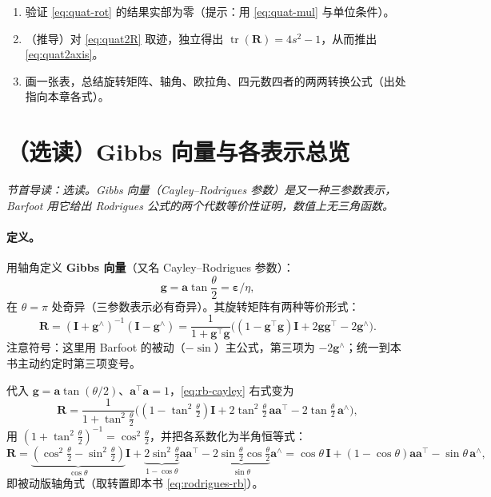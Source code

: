 \begin{practice}
\begin{enumerate}
  \item 验证 \cref{eq:quat-rot} 的结果实部为零（提示：用 \cref{eq:quat-mul} 与单位条件）。
  \item （推导）对 \cref{eq:quat2R} 取迹，独立得出 $\operatorname{tr}(\mathbf{R})=4s^2-1$，从而推出 \cref{eq:quat2axis}。
  \item 画一张表，总结旋转矩阵、轴角、欧拉角、四元数四者的两两转换公式（出处指向本章各式）。
\end{enumerate}
\end{practice}

\section{（选读）Gibbs 向量与各表示总览}
\label{sec:rb-gibbs}
\noindent\emph{节首导读：选读。Gibbs 向量（Cayley--Rodrigues 参数）是又一种三参数表示，Barfoot 用它给出 Rodrigues 公式的两个代数等价性证明，数值上无三角函数。}

\paragraph{定义。}用轴角定义 \textbf{Gibbs 向量}（又名 Cayley--Rodrigues 参数）：
\begin{equation}
  \mathbf{g}=\mathbf{a}\tan\frac{\theta}{2}=\boldsymbol{\varepsilon}/\eta,
  \label{eq:rb-gibbs}
\end{equation}
在 $\theta=\pi$ 处奇异（三参数表示必有奇异）。其旋转矩阵有两种等价形式\cite{barfoot2024state}：
\begin{equation}
  \mathbf{R}=(\mathbf{I}+\mathbf{g}^\wedge)^{-1}(\mathbf{I}-\mathbf{g}^\wedge)
  =\frac{1}{1+\mathbf{g}^\top\mathbf{g}}\big((1-\mathbf{g}^\top\mathbf{g})\mathbf{I}+2\mathbf{g}\mathbf{g}^\top-2\mathbf{g}^\wedge\big).
  \label{eq:rb-cayley}
\end{equation}
注意符号：这里用 Barfoot 的被动（$-\sin$）主公式，第三项为 $-2\mathbf{g}^\wedge$；统一到本书主动约定时第三项变号。

\begin{derivation}
代入 $\mathbf{g}=\mathbf{a}\tan(\theta/2)$、$\mathbf{a}^\top\mathbf{a}=1$，\cref{eq:rb-cayley} 右式变为
\[
  \mathbf{R}=\frac{1}{1+\tan^2\tfrac{\theta}{2}}\Big((1-\tan^2\tfrac{\theta}{2})\mathbf{I}+2\tan^2\tfrac{\theta}{2}\,\mathbf{a}\mathbf{a}^\top-2\tan\tfrac{\theta}{2}\,\mathbf{a}^\wedge\Big),
\]
用 $(1+\tan^2\tfrac{\theta}{2})^{-1}=\cos^2\tfrac{\theta}{2}$，并把各系数化为半角恒等式：
\[
  \mathbf{R}=\underbrace{(\cos^2\tfrac{\theta}{2}-\sin^2\tfrac{\theta}{2})}_{\cos\theta}\mathbf{I}
  +\underbrace{2\sin^2\tfrac{\theta}{2}}_{1-\cos\theta}\mathbf{a}\mathbf{a}^\top
  -\underbrace{2\sin\tfrac{\theta}{2}\cos\tfrac{\theta}{2}}_{\sin\theta}\mathbf{a}^\wedge
  =\cos\theta\,\mathbf{I}+(1-\cos\theta)\mathbf{a}\mathbf{a}^\top-\sin\theta\,\mathbf{a}^\wedge,
\]
即被动版轴角式（取转置即本书 \cref{eq:rodrigues-rb}）。
\end{derivation}

